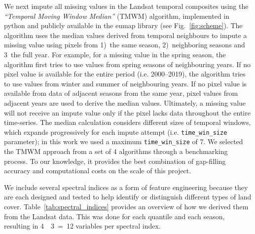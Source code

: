     We next impute all missing values in the Landsat temporal composites using the \emph{``Temporal Moving Window Median''} (TMWM) algorithm, implemented in python and publicly available in the \textsf{eumap} library (see Fig.\@~\ref{fig:scheme}). The algorithm uses the median values derived from temporal neighbours to impute a missing value using pixels from 1)\@~the same season, 2)\@~neighboring seasons and 3\@~the full year. For example, for a missing value in the spring season, the algorithm first tries to use values from spring seasons of neighbouring years. If no pixel value is available for the entire period (i.e. 2000--2019), the algorithm tries to use values from winter and summer of neighbouring years. If no pixel value is available from data of adjacent seasons from the same year, pixel values from adjacent years are used to derive the median values. Ultimately, a missing value will not receive an impute value only if the pixel lacks data throughout the entire time-series. The median calculation considers different sizes of temporal windows, which expands progressively for each impute attempt (i.e. \texttt{time\_win\_size} parameter); in this work we used a maximum \texttt{time\_win\_size} of 7. We selected the TMWM approach from a set of 4 algorithms through a benchmarking process. To our knowledge, it provides the best combination of gap-filling accuracy and computational costs on the scale of this project.

    We include several spectral indices as a form of feature engineering because they are each designed and tested to help identify or distinguish different types of land cover.  Table\@~\ref{tab:spectral_indices} provides an overview of how we derived them from the Landsat data. This was done for each quantile and each season, resulting in 4~{\texttimes}~3~=~12 variables per spectral index.
    
